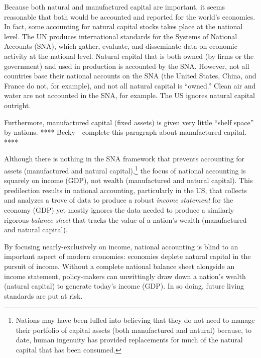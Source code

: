 Because both natural and manufactured capital are important, 
it seems reasonable that both would be accounted and reported for the world's economies.
In fact, some accounting for natural capital stocks takes place at the national level. 
The UN produces international standards for the 
Systems of National Accounts (SNA), which gather, evaluate, 
and disseminate data on economic activity at the national level. 
Natural capital that is both owned (by firms or the government) and used in production
is accounted by the SNA. 
However, not all countries base their national accounts on the SNA 
(the United States, China, and France do not, for example), 
and not all natural capital is ``owned.'' 
Clean air and water are not accounted in the SNA, for example. 
The US ignores natural capital outright.

Furthermore, manufactured capital (fixed assets) is given very little ``shelf space'' 
by nations. **** Becky - complete this paragraph about manufactured capital. ****

Although there is nothing in the SNA framework that prevents 
accounting for assets (manufactured and natural capital),\footnote{Nations 
	may have been lulled into believing that they 
	do not need to manage their portfolio of capital assets 
	(both manufactured and natural)
	because, to date, human ingenuity has provided replacements for much of the
	natural capital that has been consumed.}
the focus of national accounting is squarely on income (GDP), 
not wealth (manufactured and natural capital).\cite[p.~415]{UNSNA2008}  
This predilection results in national accounting,
particularly in the US, that collects and analyzes a trove of data to
produce a robust \emph{income statement} for the economy (GDP)
yet mostly ignores the data needed to produce a similarly rigorous
\emph{balance sheet} that tracks the value 
of a nation's wealth (manufactured and natural capital). 

By focusing nearly-exclusively on income, 
national accounting is blind to an important aspect of modern economies:
economies deplete natural capital in the pursuit of income.
Without a complete national balance sheet alongside an income statement, 
policy-makers can unwittingly draw down a nation's wealth (natural capital) 
to generate today's income (GDP). 
In so doing, future living standards are put at risk. 

